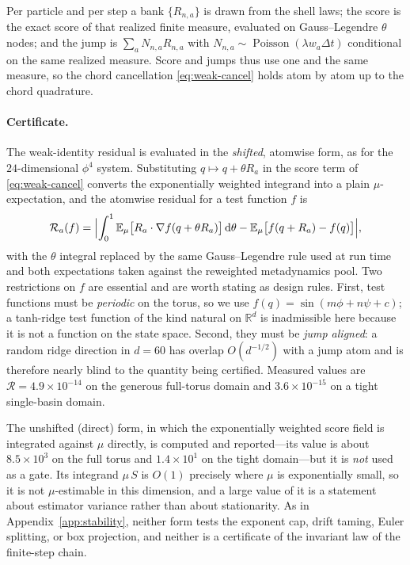 \documentclass[11pt]{article}
\newcommand{\R}{\mathbb{R}}
\newcommand{\dd}{\,\mathrm{d}}
\newcommand{\E}{\mathbb{E}}
\begin{document}
Per particle and per step a
bank $\{R_{n,a}\}$ is drawn from the shell laws; the score is the exact score
of that realized finite measure, evaluated on Gauss--Legendre $\theta$ nodes;
and the jump is $\sum_aN_{n,a}R_{n,a}$ with
$N_{n,a}\sim\operatorname{Poisson}(\lambda w_a\Delta t)$ conditional on the
same realized measure.  Score and jumps thus use one and the same measure, so
the chord cancellation \eqref{eq:weak-cancel} holds atom by atom up to the
chord quadrature.

\paragraph{Certificate.}
The weak-identity residual is evaluated in the \emph{shifted}, atomwise form,
as for the $24$-dimensional $\phi^4$ system.  Substituting $q\mapsto q+\theta
R_a$ in the score term of \eqref{eq:weak-cancel} converts the exponentially
weighted integrand into a plain $\mu$-expectation, and the atomwise residual
for a test function $f$ is
\begin{equation}
 \mathcal{R}_a(f)
 =\Bigl|\int_0^1\E_{\mu}\bigl[R_a\cdot\nabla f(q+\theta R_a)\bigr]\dd\theta
 -\E_{\mu}\bigl[f(q+R_a)-f(q)\bigr]\Bigr| ,
 \label{eq:e5-residual}
\end{equation}
with the $\theta$ integral replaced by the same Gauss--Legendre rule used at
run time and both expectations taken against the reweighted metadynamics pool.
Two restrictions on $f$ are essential and are worth stating as design rules.
First, test functions must be \emph{periodic} on the torus, so we use
$f(q)=\sin(m\phi+n\psi+c)$; a tanh-ridge test function of the kind natural on
$\R^d$ is inadmissible here because it is not a function on the state space.
Second, they must be \emph{jump aligned}: a random ridge direction in $d=60$
has overlap $O(d^{-1/2})$ with a jump atom and is therefore nearly blind to the
quantity being certified.  Measured values are
$\mathcal{R}=4.9\times10^{-14}$ on the generous full-torus domain and
$3.6\times10^{-15}$ on a tight single-basin domain.

The unshifted (direct) form, in which the exponentially weighted score field is
integrated against $\mu$ directly, is computed and reported---its value is
about $8.5\times10^{3}$ on the full torus and $1.4\times10^{1}$ on the tight
domain---but it is \emph{not} used as a gate.  Its integrand
$\mu\,S$ is $O(1)$ precisely where $\mu$ is exponentially small, so it is not
$\mu$-estimable in this dimension, and a large value of it is a statement about
estimator variance rather than about stationarity.  As in
Appendix~\ref{app:stability}, neither form tests the exponent cap, drift
taming, Euler splitting, or box projection, and neither is a certificate of the
invariant law of the finite-step chain.
\end{document}
